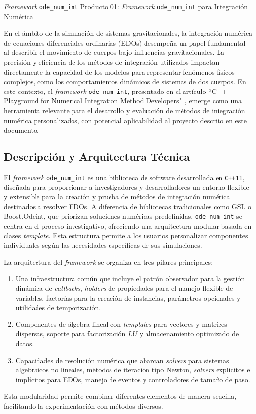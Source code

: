 \textit{Framework} \texttt{ode\_num\_int}]{Producto 01: \textit{Framework} \texttt{ode\_num\_int} para Integración Numérica}\label{sec:ode_num_int}

En el ámbito de la simulación de sistemas gravitacionales, la integración numérica de ecuaciones diferenciales ordinarias (EDOs) desempeña un papel fundamental al describir el movimiento de cuerpos bajo influencias gravitacionales. La precisión y eficiencia de los métodos de integración utilizados impactan directamente la capacidad de los modelos para representar fenómenos físicos complejos, como los comportamientos dinámicos de sistemas de dos cuerpos. En este contexto, el \textit{framework} \texttt{ode\_num\_int}, presentado en el artículo ``C++ Playground for Numerical Integration Method Developers"~\cite{Orlov2017}, emerge como una herramienta relevante para el desarrollo y evaluación de métodos de integración numérica personalizados, con potencial aplicabilidad al proyecto descrito en este documento.

\subsection{Descripción y Arquitectura Técnica}

El \textit{framework} \texttt{ode\_num\_int} es una biblioteca de software desarrollada en \texttt{C++11}, diseñada para proporcionar a investigadores y desarrolladores un entorno flexible y extensible para la creación y prueba de métodos de integración numérica destinados a resolver EDOs. A diferencia de bibliotecas tradicionales como GSL o Boost.Odeint, que priorizan soluciones numéricas predefinidas, \texttt{ode\_num\_int} se centra en el proceso investigativo, ofreciendo una arquitectura modular basada en clases \textit{template}. Esta estructura permite a los usuarios personalizar componentes individuales según las necesidades específicas de sus simulaciones.

La arquitectura del \textit{framework} se organiza en tres pilares principales:
\begin{enumerate} 
    \item Una infraestructura común que incluye el patrón observador para la gestión dinámica de \textit{callbacks}, \textit{holders} de propiedades para el manejo flexible de variables, factorías para la creación de instancias, parámetros opcionales y utilidades de temporización. 
    \item Componentes de álgebra lineal con \textit{templates} para vectores y matrices dispersas, soporte para factorización $LU$ y almacenamiento optimizado de datos. 
    \item Capacidades de resolución numérica que abarcan \textit{solvers} para sistemas algebraicos no lineales, métodos de iteración tipo Newton, \textit{solvers} explícitos e implícitos para EDOs, manejo de eventos y controladores de tamaño de paso. 
\end{enumerate}
Esta modularidad permite combinar diferentes elementos de manera sencilla, facilitando la experimentación con métodos diversos.

